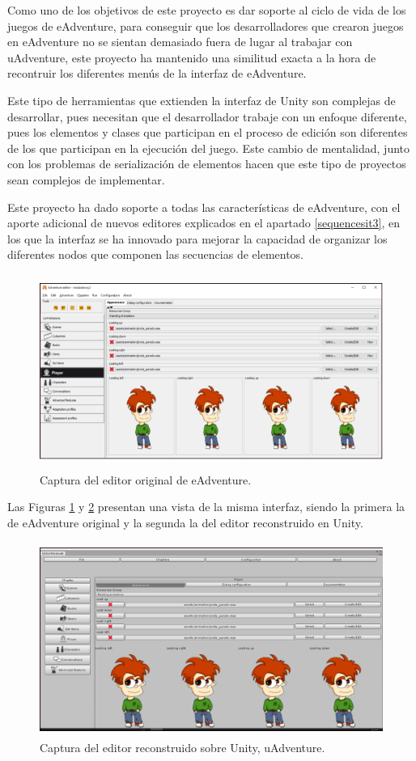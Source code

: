 Como uno de los objetivos de este proyecto es dar soporte al ciclo de vida de los juegos de eAdventure, para conseguir que los desarrolladores que crearon juegos en eAdventure no se sientan demasiado fuera de lugar al trabajar con uAdventure, este proyecto ha mantenido una similitud exacta a la hora de recontruir los diferentes menús de la interfaz de eAdventure.

Este tipo de herramientas que extienden la interfaz de Unity son complejas de desarrollar, pues necesitan que el desarrollador trabaje con un enfoque diferente, pues los elementos y clases que participan en el proceso de edición son diferentes de los que participan en la ejecución del juego. Este cambio de mentalidad, junto con los problemas de serialización de elementos hacen que este tipo de proyectos sean complejos de implementar.

Este proyecto ha dado soporte a todas las características de eAdventure, con el aporte adicional de nuevos editores explicados en el apartado \ref{sequencesit3}, en los que la interfaz se ha innovado para mejorar la capacidad de organizar los diferentes nodos que componen las secuencias de elementos.

\begin{figure}[h!]
	\centerline{\includegraphics[height=2.5in]{figures/eadventure.png}}
	\caption[uAdventure editor - eAdventure]{Captura del editor original de eAdventure.}
	\label{eadventureeditor}
\end{figure}

Las Figuras \ref{eadventureeditor} y \ref{uadventureeditor} presentan una vista de la misma interfaz, siendo la primera la de eAdventure original y la segunda la del editor reconstruido en Unity.

\begin{figure}[h!]
	\centerline{\includegraphics[height=2.5in]{figures/uadventure.png}}
	\caption[uAdventure editor - uAdventure]{Captura del editor reconstruido sobre Unity, uAdventure.}
	\label{uadventureeditor}
\end{figure}

